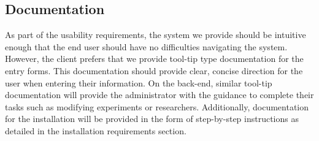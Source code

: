 \subsection{Documentation}
As part of the usability requirements, the system we provide should be intuitive enough that the end user should have no difficulties navigating the system. However, the client prefers that we provide tool-tip type documentation for the entry forms. This documentation should provide clear, concise direction for the user when entering their information. On the back-end, similar tool-tip documentation will provide the administrator with the guidance to complete their tasks such as modifying experiments or researchers. Additionally, documentation for the installation will be provided in the form of step-by-step instructions as detailed in the installation requirements section.